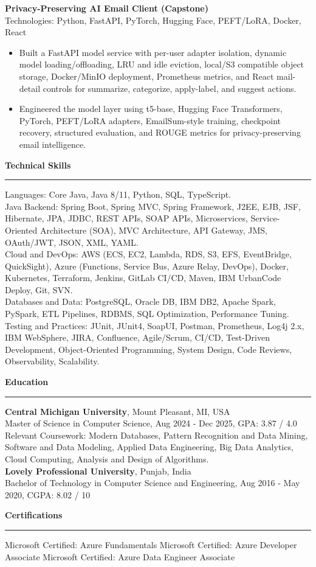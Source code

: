 \documentclass[10pt,letterpaper]{article}
\newcommand{\ressection}[1]{%
  \vspace{3pt}\par\textbf{#1}\par\vspace{1pt}\hrule\vspace{2pt}
}
\begin{document}
\textbf{Privacy-Preserving AI Email Client (Capstone)}\\
Technologies: Python, FastAPI, PyTorch, Hugging Face, PEFT/LoRA, Docker, React
\begin{itemize}
  \item Built a FastAPI model service with per-user adapter isolation, dynamic model loading/offloading, LRU and idle eviction, local/S3 compatible object storage, Docker/MinIO deployment, Prometheus metrics, and React mail-detail controls for summarize, categorize, apply-label, and suggest actions.
  \item Engineered the model layer using t5-base, Hugging Face Transformers, PyTorch, PEFT/LoRA adapters, EmailSum-style training, checkpoint recovery, structured evaluation, and ROUGE metrics for privacy-preserving email intelligence.
\end{itemize}

\ressection{Technical Skills}
Languages: Core Java, Java 8/11, Python, SQL, TypeScript.\\
Java Backend: Spring Boot, Spring MVC, Spring Framework, J2EE, EJB, JSF, Hibernate, JPA, JDBC, REST APIs, SOAP APIs, Microservices, Service-Oriented Architecture (SOA), MVC Architecture, API Gateway, JMS, OAuth/JWT, JSON, XML, YAML.\\
Cloud and DevOps: AWS (ECS, EC2, Lambda, RDS, S3, EFS, EventBridge, QuickSight), Azure (Functions, Service Bus, Azure Relay, DevOps), Docker, Kubernetes, Terraform, Jenkins, GitLab CI/CD, Maven, IBM UrbanCode Deploy, Git, SVN.\\
Databases and Data: PostgreSQL, Oracle DB, IBM DB2, Apache Spark, PySpark, ETL Pipelines, RDBMS, SQL Optimization, Performance Tuning.\\
Testing and Practices: JUnit, JUnit4, SoapUI, Postman, Prometheus, Log4j 2.x, IBM WebSphere, JIRA, Confluence, Agile/Scrum, CI/CD, Test-Driven Development, Object-Oriented Programming, System Design, Code Reviews, Observability, Scalability.

\ressection{Education}
\textbf{Central Michigan University}, Mount Pleasant, MI, USA\\
Master of Science in Computer Science, Aug 2024 - Dec 2025, GPA: 3.87 / 4.0\\
Relevant Coursework: Modern Databases, Pattern Recognition and Data Mining, Software and Data Modeling, Applied Data Engineering, Big Data Analytics, Cloud Computing, Analysis and Design of Algorithms.\\
\textbf{Lovely Professional University}, Punjab, India\\
Bachelor of Technology in Computer Science and Engineering, Aug 2016 - May 2020, CGPA: 8.02 / 10

\ressection{Certifications}
Microsoft Certified: Azure Fundamentals \textbar{} Microsoft Certified: Azure Developer Associate \textbar{} Microsoft Certified: Azure Data Engineer Associate
\end{document}

